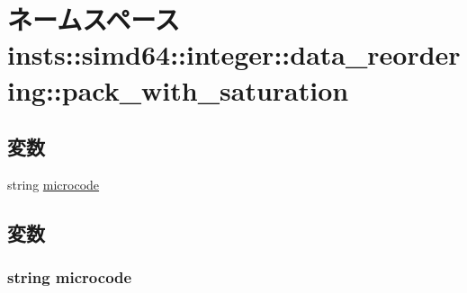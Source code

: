 \hypertarget{namespaceinsts_1_1simd64_1_1integer_1_1data__reordering_1_1pack__with__saturation}{
\section{ネームスペース insts::simd64::integer::data\_\-reordering::pack\_\-with\_\-saturation}
\label{namespaceinsts_1_1simd64_1_1integer_1_1data__reordering_1_1pack__with__saturation}
}
\subsection*{変数}
\begin{DoxyCompactItemize}
\item 
string \hyperlink{namespaceinsts_1_1simd64_1_1integer_1_1data__reordering_1_1pack__with__saturation_a770f11a173e99389a8802f0107ed8f52}{microcode}
\end{DoxyCompactItemize}


\subsection{変数}
\hypertarget{namespaceinsts_1_1simd64_1_1integer_1_1data__reordering_1_1pack__with__saturation_a770f11a173e99389a8802f0107ed8f52}{
\subsubsection[{microcode}]{\setlength{\rightskip}{0pt plus 5cm}string {\bf microcode}}}
\label{namespaceinsts_1_1simd64_1_1integer_1_1data__reordering_1_1pack__with__saturation_a770f11a173e99389a8802f0107ed8f52}
